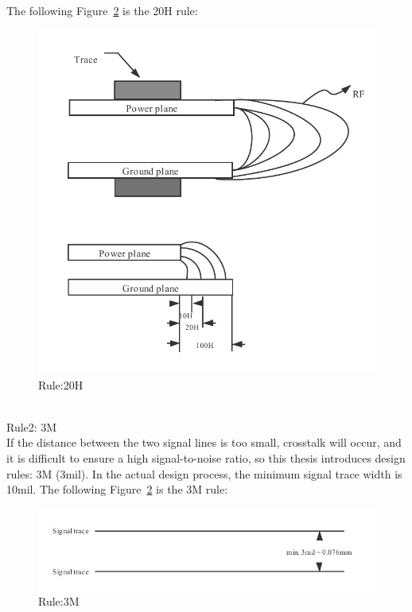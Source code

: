 \\
The following Figure~\ref{fig:6.13} is the 20H rule:
 
\begin{figure}[!ht]
	\centering
	\includegraphics[width=15cm]{grafiken/6.12.pdf}
	\caption{Rule:20H} 
	\label{fig:6.12}
\end{figure}
\FloatBarrier
\\

Rule2: 3M
\\
If the distance between the two signal lines is too small, crosstalk will occur, and it is difficult to ensure a high signal-to-noise ratio, so this thesis introduces design rules: 3M (3mil). In the actual design process, the minimum signal trace width is 10mil.
The following Figure~\ref{fig:6.13} is the 3M rule:

\begin{figure}[!ht]
	\centering
	\includegraphics[width=16cm]{grafiken/6.13.pdf}
	\caption{Rule:3M} 
	\label{fig:6.13}
\end{figure}
\FloatBarrier
\\


